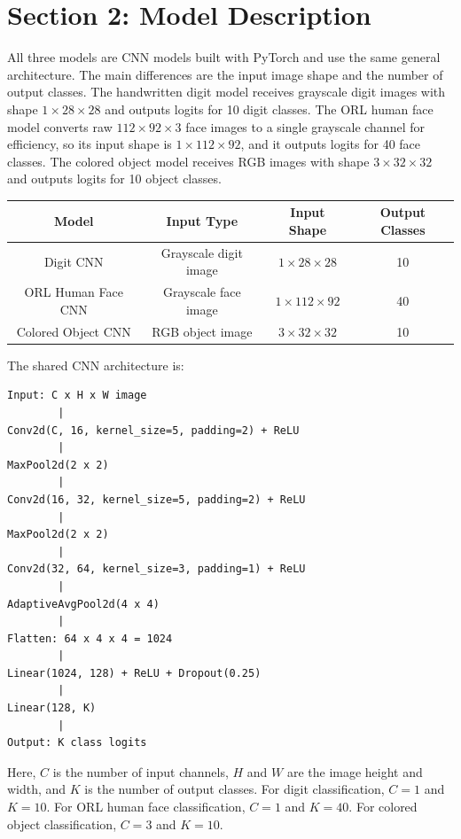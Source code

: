 \documentclass[10pt]{article}
\begin{document}
\section*{Section 2: Model Description}

All three models are CNN models built with PyTorch and use the same general architecture. The main differences are the input image shape and the number of output classes. The handwritten digit model receives grayscale digit images with shape $1 \times 28 \times 28$ and outputs logits for 10 digit classes. The ORL human face model converts raw $112 \times 92 \times 3$ face images to a single grayscale channel for efficiency, so its input shape is $1 \times 112 \times 92$, and it outputs logits for 40 face classes. The colored object model receives RGB images with shape $3 \times 32 \times 32$ and outputs logits for 10 object classes.

\begin{center}
\small
\begin{tabular}{c|c|c|c}
\textbf{Model} & \textbf{Input Type} & \textbf{Input Shape} & \textbf{Output Classes} \\
\hline
Digit CNN & Grayscale digit image & $1 \times 28 \times 28$ & 10 \\
ORL Human Face CNN & Grayscale face image & $1 \times 112 \times 92$ & 40 \\
Colored Object CNN & RGB object image & $3 \times 32 \times 32$ & 10 \\
\end{tabular}
\end{center}

The shared CNN architecture is:

\begin{lstlisting}
Input: C x H x W image
        |
Conv2d(C, 16, kernel_size=5, padding=2) + ReLU
        |
MaxPool2d(2 x 2)
        |
Conv2d(16, 32, kernel_size=5, padding=2) + ReLU
        |
MaxPool2d(2 x 2)
        |
Conv2d(32, 64, kernel_size=3, padding=1) + ReLU
        |
AdaptiveAvgPool2d(4 x 4)
        |
Flatten: 64 x 4 x 4 = 1024
        |
Linear(1024, 128) + ReLU + Dropout(0.25)
        |
Linear(128, K)
        |
Output: K class logits
\end{lstlisting}

Here, $C$ is the number of input channels, $H$ and $W$ are the image height and width, and $K$ is the number of output classes. For digit classification, $C=1$ and $K=10$. For ORL human face classification, $C=1$ and $K=40$. For colored object classification, $C=3$ and $K=10$.
\end{document}
